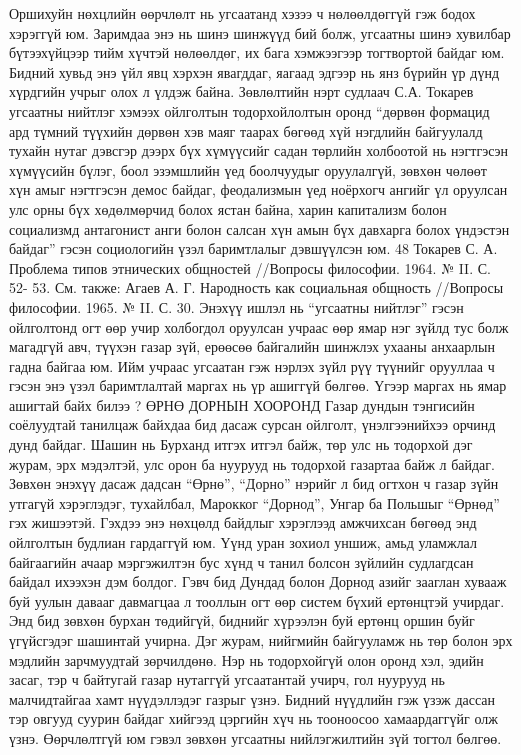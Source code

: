 Оршихуйн нөхцлийн өөрчлөлт нь угсаатанд хэзээ ч нөлөөлдөггүй гэж бодох хэрэггүй юм. Заримдаа энэ нь шинэ шинжүүд бий болж, угсаатны шинэ хувилбар бүтээхүйцээр тийм хүчтэй нөлөөлдөг, их бага хэмжээгээр тогтвортой байдаг юм. Бидний хувьд энэ үйл явц хэрхэн явагддаг, яагаад эдгээр нь янз бүрийн үр дүнд хүрдгийн учрыг олох л үлдэж байна.
Зөвлөлтийн нэрт судлаач С.А. Токарев угсаатны нийтлэг хэмээх ойлголтын тодорхойлолтын оронд “дөрвөн формацид ард түмний түүхийн дөрвөн хэв маяг таарах бөгөөд хүй нэгдлийн байгуулалд тухайн нутаг дэвсгэр дээрх бүх хүмүүсийг садан төрлийн холбоотой нь нэгтгэсэн хүмүүсийн бүлэг, боол эзэмшлийн үед боолчуудыг оруулалгүй, зөвхөн чөлөөт хүн амыг нэгтгэсэн демос байдаг, феодализмын үед ноёрхогч ангийг үл оруулсан улс орны бүх хөдөлмөрчид болох ястан байна, харин капитализм болон социализмд антагонист анги болон салсан хүн амын бүх давхарга болох үндэстэн байдаг” гэсэн социологийн үзэл баримтлалыг дэвшүүлсэн юм.
48 Токарев С. А. Проблема типов этнических общностей //Вопросы философии. 1964. № II. С. 52- 53. См. также: Агаев А. Г. Народность как социальная общность //Вопросы философии. 1965. № II. С. 30.
Энэхүү ишлэл нь “угсаатны нийтлэг” гэсэн ойлголтонд огт өөр учир холбогдол оруулсан учраас өөр ямар нэг зүйлд тус болж магадгүй авч, түүхэн газар зүй, ерөөсөө байгалийн шинжлэх ухааны анхаарлын гадна байгаа юм. Ийм учраас угсаатан гэж нэрлэх зүйл рүү түүнийг орууллаа ч гэсэн энэ үзэл баримтлалтай маргах нь үр ашиггүй бөлгөө. Үгээр маргах нь ямар ашигтай байх билээ ?
ӨРНӨ ДОРНЫН ХООРОНД
Газар дундын тэнгисийн соёлуудтай танилцаж байхдаа бид дасаж сурсан ойлголт, үнэлгээнийхээ орчинд дунд байдаг. Шашин нь Бурханд итгэх итгэл байж, төр улс нь тодорхой дэг журам, эрх мэдэлтэй, улс орон ба нуурууд нь тодорхой газартаа байж л байдаг.
Зөвхөн энэхүү дасаж дадсан “Өрнө”, “Дорно” нэрийг л бид огтхон ч газар зүйн утгагүй хэрэглэдэг, тухайлбал, Марокког “Дорнод”, Унгар ба Польшыг “Өрнөд” гэх жишээтэй. Гэхдээ энэ нөхцөлд байдлыг хэрэглээд амжчихсан бөгөөд энд ойлголтын будлиан гардаггүй юм. Үүнд уран зохиол уншиж, амьд уламжлал байгаагийн ачаар мэргэжилтэн бус хүнд ч танил болсон зүйлийн судлагдсан байдал ихээхэн дэм болдог.
Гэвч бид Дундад болон Дорнод азийг зааглан хувааж буй уулын давааг давмагцаа л тооллын огт өөр систем бүхий ертөнцтэй учирдаг. Энд бид зөвхөн бурхан төдийгүй, биднийг хүрээлэн буй ертөнц оршин буйг үгүйсгэдэг шашинтай учирна. Дэг журам, нийгмийн байгууламж нь төр болон эрх мэдлийн зарчмуудтай зөрчилдөнө. Нэр нь тодорхойгүй олон оронд хэл, эдийн засаг, тэр ч байтугай газар нутаггүй угсаатантай учирч, гол нуурууд нь малчидтайгаа хамт нүүдэллэдэг газрыг үзнэ. Бидний нүүдлийн гэж үзэж дассан тэр овгууд суурин байдаг хийгээд цэргийн хүч нь тооноосоо хамаардаггүйг олж үзнэ. Өөрчлөлтгүй юм гэвэл зөвхөн угсаатны нийлэгжилтийн зүй тогтол бөлгөө.
